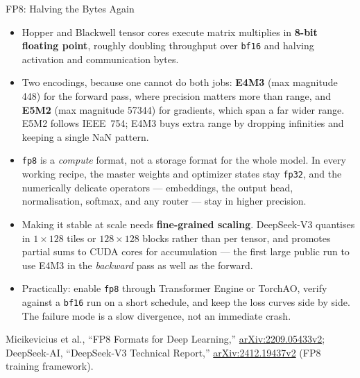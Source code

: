 \begin{frame}[allowframebreaks]{FP8: Halving the Bytes Again}
  \begin{itemize}\itemsep0.35em
    \item[\textcolor{red}{$\blacktriangleright$}] Hopper and Blackwell tensor cores execute matrix multiplies in \textbf{8-bit floating point}, roughly doubling throughput over \texttt{bf16} and halving activation and communication bytes.
    \item[\textcolor{red}{$\blacktriangleright$}] Two encodings, because one cannot do both jobs: \textbf{E4M3} (max magnitude 448) for the forward pass, where precision matters more than range, and \textbf{E5M2} (max magnitude 57344) for gradients, which span a far wider range. E5M2 follows IEEE~754; E4M3 buys extra range by dropping infinities and keeping a single NaN pattern.
    \item[\textcolor{red}{$\blacktriangleright$}] \texttt{fp8} is a \emph{compute} format, not a storage format for the whole model. In every working recipe, the master weights and optimizer states stay \texttt{fp32}, and the numerically delicate operators --- embeddings, the output head, normalisation, softmax, and any router --- stay in higher precision.
    \item[\textcolor{red}{$\blacktriangleright$}] Making it stable at scale needs \textbf{fine-grained scaling}. DeepSeek-V3 quantises in $1 \times 128$ tiles or $128 \times 128$ blocks rather than per tensor, and promotes partial sums to CUDA cores for accumulation --- the first large public run to use E4M3 in the \emph{backward} pass as well as the forward.
    \item[\textcolor{red}{$\blacktriangleright$}] Practically: enable \texttt{fp8} through Transformer Engine or TorchAO, verify against a \texttt{bf16} run on a short schedule, and keep the loss curves side by side. The failure mode is a slow divergence, not an immediate crash.
  \end{itemize}
  \vspace{0.1em}
  {\scriptsize Micikevicius et al., ``FP8 Formats for Deep Learning,'' \href{https://arxiv.org/abs/2209.05433v2}{arXiv:2209.05433v2}; DeepSeek-AI, ``DeepSeek-V3 Technical Report,'' \href{https://arxiv.org/abs/2412.19437v2}{arXiv:2412.19437v2} (FP8 training framework).}
\end{frame}

